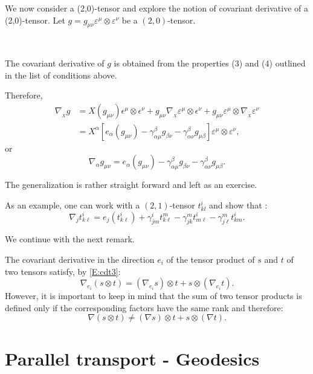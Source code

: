 We now consider a (2,0)-tensor and explore the notion of covariant derivative of a (2,0)-tensor. Let $g=g_{\mu\nu}\varepsilon^\mu\otimes \varepsilon^{\nu}$ be a $(2,0)$-tensor.

\,

The covariant derivative of $g$ is obtained from the properties (3) and (4) outlined in the list of conditions above. 

Therefore, 
\[\begin{aligned}
\nabla_{_{X}}g&= X(g_{\mu\nu})\epsilon^\mu\otimes \epsilon^{\nu}+g_{\mu\nu}\nabla_{_{X}}\varepsilon^\mu\otimes \epsilon^{\nu}+g_{\mu\nu}\varepsilon^\mu\otimes \nabla_{_{X}}\varepsilon^{\nu}\\
&=X^{\alpha}[e_{\alpha}(g_{\mu\nu})-\gamma^{\beta}_{\alpha\mu} g_{\beta\nu}-\gamma^{\beta}_{\alpha\nu} g_{\mu\beta}]\varepsilon^{\mu}\otimes \varepsilon^{\nu},
\end{aligned}\]
or
\begin{equation}\label{covmetric}
\nabla_\alpha g_{\mu\nu}=e_{\alpha}(g_{\mu\nu})-\gamma^{\beta}_{\alpha\mu} g_{\beta\nu}-\gamma^{\beta}_{\alpha\nu} g_{\mu\beta}.
\end{equation}

\begin{ex}
The generalization is rather straight forward and left as an exercise. 
    
\end{ex}

\begin{ex}
As an example, one can work with a $(2,1)$-tensor $t_{kl}^i$ and show that : 
\[
\nabla_j t^{i}_{k\ell}=e_{j}(t^{i}_{k\ell})+\gamma^{i}_{jm}t^{m}_{k\ell} -\gamma^{m}_{jk} t^{i}_{m\ell}-\gamma^{m}_{j\ell} t^{i}_{km}.
\]
    
\end{ex}

We continue with the next remark. 
\begin{remark}
 The covariant derivative in the direction $e_{i}$ of the tensor product of  $s$ and $t$ of two tensors satisfy, by \eqref{E:cdt3}:
 \[\nabla_{e_{i}}(s\otimes t)=(\nabla_{e_{i}}s)\otimes t+s\otimes ( \nabla_{e_{i}}t).\]
However, it is important to keep in mind that the sum of two tensor products is defined only if the corresponding factors have the same rank and therefore:
\[
 \nabla (s\otimes t)\not=(\nabla s)\otimes t+s\otimes ( \nabla t).
\] 
\end{remark}

\section{Parallel transport - Geodesics}

